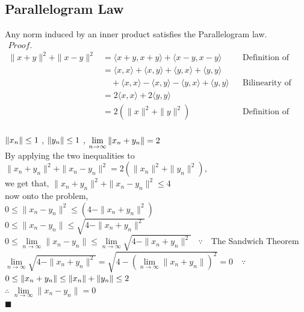 \documentclass[12pt]{article}
\begin{document}
 \subsection{Parallelogram Law}
	Any norm induced by an inner product satisfies the Parallelogram law\cite{hardy}.
	\begin{align*}
		Proof.    \quad \quad \quad \quad  \quad \phantom{=} \\
		\|x + y\|^2 + \|x - y\|^2 
		&= \langle x + y, x + y \rangle + \langle x - y, x - y \rangle && \text{Definition of Inner Product Norm} \\
		&= \langle x, x \rangle + \langle x, y \rangle + \langle y, x \rangle + \langle y, y \rangle \\
		&\quad + \langle x, x \rangle - \langle x, y \rangle - \langle y, x \rangle + \langle y, y \rangle && \text{Bilinearity of Inner Product} \\
		&= 2 \langle x, x \rangle + 2 \langle y, y \rangle \\
		&= 2 \left( \|x\|^2 + \|y\|^2 \right) && \text{Definition of Inner Product Norm}
		\end{align*}
	\vspace{5pt} \\
	$\Arrowvert x_n\Arrowvert \leq1$ , 
	$\Arrowvert y_n\Arrowvert \leq1$ ,
	$\lim\limits_{n\rightarrow \infty} \Arrowvert x_n+y_n\Arrowvert =2$
	\vspace{5pt} \\
	By applying the two inequalities to 
	$\|x_n + y_n\|^2 + \|x_n - y_n\|^2=2 \left( \|x_n\|^2 + \|y_n\|^2 \right)$, \vspace{5pt} \\
	we get that, \quad
	$\|x_n + y_n\|^2 + \|x_n - y_n\|^2 \leq 4$ \vspace{5pt} \\
now onto the problem, \\
	$0 \leq \|x_n - y_n\|^2 \leq \left({4 - \|x_n + y_n\|^2}\right)$ \vspace{5pt} \\
	$0 \leq \|x_n - y_n\| \leq \sqrt{4 - \|x_n + y_n\|^2}$ \vspace{5pt} \\
	$0 \leq \lim\limits_{n\rightarrow \infty} \|x_n - y_n\| \leq \lim\limits_{n\rightarrow \infty} \sqrt{4 - \|x_n + y_n\|^2} $ \quad \quad \quad {} \, $\because$ \,\, The Sandwich Theorem \vspace{5pt} \\
	$ \lim\limits_{n\rightarrow \infty} \sqrt{4 - \|x_n + y_n\|^2} =  \sqrt{4 - \left({\lim\limits_{n\rightarrow \infty}\|x_n + y_n\|}\right)^2}=0$
	 \,\, $\because$ \,\,  $0\leq\Arrowvert x_n+y_n\Arrowvert \leq 
	\Arrowvert x_n\Arrowvert + \Arrowvert y_n\Arrowvert \leq 2$
	 \vspace{5pt} \\
	$ \therefore \, \, \lim\limits_{n\rightarrow \infty} \|x_n - y_n\| = 0$  \\
	\phantom{a} \hfill$\blacksquare$
	
\end{document}
